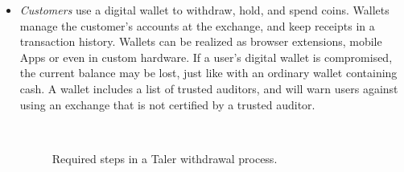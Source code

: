 \documentclass{llncs}
\begin{document}
\begin{itemize}
\item
{\em Customers} use a digital wallet to withdraw,
hold, and spend coins. Wallets manage the customer's accounts
at the exchange, and keep receipts in a transaction history.  Wallets can be
realized as browser extensions, mobile Apps or even in custom
hardware.  If a user's digital wallet is compromised, the current
balance may be lost, just like with an ordinary wallet containing cash.
A wallet includes a list of trusted auditors, and will warn
users against using an exchange that is not certified by a trusted
auditor.

\begin{figure}[b!]%
 \hfill
{} \\
 \hfill
{}
\caption{Required steps in a Taler withdrawal process.}
\label{fig:withdrawal}
\end{figure}




\end{itemize}
\end{document}
